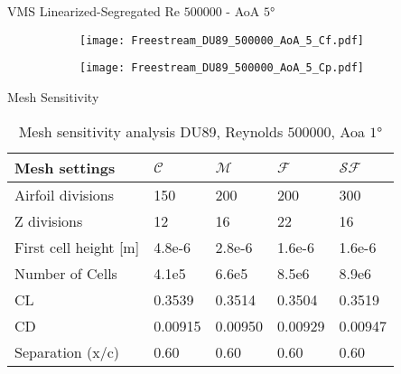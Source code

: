 \begin{frame}{VMS Linearized-Segregated}
Re $\num{500000}$ - AoA $\ang{5}$ 
\begin{figure}[h]
     \centering          
     \begin{subfigure}[h]{0.45\textwidth}
              \centering
         \texttt{[image: Freestream\_DU89\_500000\_AoA\_5\_Cf.pdf]}
    \end{subfigure}
          \hfill
     \begin{subfigure}[h]{0.45\textwidth}
      \centering
         \texttt{[image: Freestream\_DU89\_500000\_AoA\_5\_Cp.pdf]}
     \end{subfigure}
     \end{figure} 
 \end{frame}


\begin{frame}{Mesh Sensitivity}
\begin{table}[!ht]
     \centering
     \begin{tabular}{l|llll}
         \hline
         Mesh settings & $\mathcal{C}$ & $\mathcal{M}$ & $\mathcal{F}$ & $\mathcal{SF}$ \\  \hline
         Airfoil divisions & 150 & 200 & 200 & 300 \\ 
         Z divisions & 12 & 16 & 22 & 16 \\ 
         First cell height [m] & 4.8e-6 & 2.8e-6 & 1.6e-6 & 1.6e-6 \\ 
         Number of Cells & 4.1e5 & 6.6e5 & 8.5e6 & 8.9e6 \\ \hline
         CL & 0.3539 & 0.3514 & 0.3504 & 0.3519 \\
         CD & 0.00915 & 0.00950 & 0.00929 & 0.00947 \\ 
         Separation (x/c) & 0.60 & 0.60 & 0.60 & 0.60 \\ 
     \end{tabular}
 \caption{Mesh sensitivity analysis DU89, Reynolds $\num{500000}$, Aoa $\ang{1}$}
 \label{tab:mesh-sensitivity-re500000}
 \end{table}
\end{frame}



